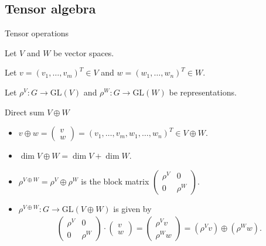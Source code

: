 \documentclass[handout, 10pt]{beamer}
\newcommand{\GL}{\text{GL}}
\begin{document}
	\subsection{Tensor algebra}
	
	\begin{frame}[allowframebreaks]{Tensor operations}
		
		Let $V$ and $W$ be vector spaces.
		
		Let $v = (v_1, \dots, v_m)^T \in V$ and $w = (w_1, \dots, w_n)^T \in W$. 
		
		Let $\rho^V: G \rightarrow \GL(V)$ and $\rho^W: G \rightarrow \GL(W)$ be representations.

		\begin{block}{Direct sum $V \oplus W$}
			\begin{itemize}
				\item $v \oplus w = \begin{pmatrix}
					v \\ w
				\end{pmatrix} = (v_1, \dots, v_m, w_1, \dots, w_n)^T \in V \oplus W$.
				
				\item $\dim V \oplus W = \dim V + \dim W$.
				
				\item $\rho^{V \oplus W} = \rho^V \oplus \rho^W$ is the block matrix $\begin{pmatrix}
					\rho^V & 0 \\ 0 & \rho^W
				\end{pmatrix}$.
				
				\item $\rho^{V \oplus W}: G \rightarrow \GL(V \oplus W)$ is given by 
				\begin{align*}
					\begin{pmatrix}
						\rho^V & 0 \\ 0 & \rho^W
					\end{pmatrix} \cdot \begin{pmatrix}
						v \\ w
					\end{pmatrix} 
					= \begin{pmatrix}
						\rho^V  v \\ \rho^W  w
					\end{pmatrix} 
					= (\rho^V v) \oplus (\rho^W w).
				\end{align*}
			\end{itemize}
		\end{block}
		

\end{frame}
\end{document}
